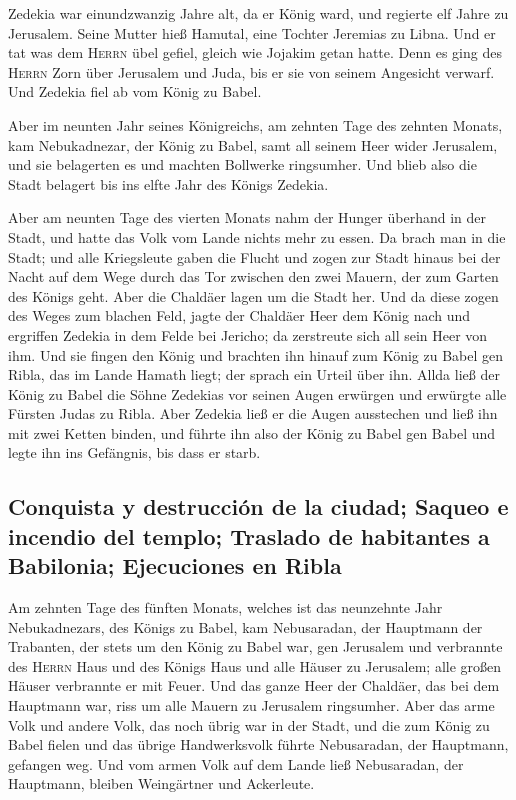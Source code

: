  Zedekia war einundzwanzig Jahre alt, da er König ward,
und regierte elf Jahre zu Jerusalem. Seine Mutter hieß Hamutal, eine
Tochter Jeremias zu Libna.  Und er tat was dem
\textsc{Herrn} übel gefiel, gleich wie Jojakim getan hatte.
 Denn es ging des \textsc{Herrn} Zorn über Jerusalem und
Juda, bis er sie von seinem Angesicht verwarf. Und Zedekia fiel ab vom
König zu Babel.

 Aber im neunten Jahr seines Königreichs, am zehnten Tage
des zehnten Monats, kam Nebukadnezar, der König zu Babel, samt all
seinem Heer wider Jerusalem, und sie belagerten es und machten Bollwerke
ringsumher.  Und blieb also die Stadt belagert bis ins
elfte Jahr des Königs Zedekia.

 Aber am neunten Tage des vierten Monats nahm der Hunger
überhand in der Stadt, und hatte das Volk vom Lande nichts mehr zu
essen.  Da brach man in die Stadt; und alle Kriegsleute
gaben die Flucht und zogen zur Stadt hinaus bei der Nacht auf dem Wege
durch das Tor zwischen den zwei Mauern, der zum Garten des Königs geht.
Aber die Chaldäer lagen um die Stadt her.  Und da diese
zogen des Weges zum blachen Feld, jagte der Chaldäer Heer dem König nach
und ergriffen Zedekia in dem Felde bei Jericho; da zerstreute sich all
sein Heer von ihm.  Und sie fingen den König und brachten
ihn hinauf zum König zu Babel gen Ribla, das im Lande Hamath liegt; der
sprach ein Urteil über ihn.  Allda ließ der König zu
Babel die Söhne Zedekias vor seinen Augen erwürgen und erwürgte alle
Fürsten Judas zu Ribla.  Aber Zedekia ließ er die Augen
ausstechen und ließ ihn mit zwei Ketten binden, und führte ihn also der
König zu Babel gen Babel und legte ihn ins Gefängnis, bis dass er starb.

\hypertarget{conquista-y-destrucciuxf3n-de-la-ciudad-saqueo-e-incendio-del-templo-traslado-de-habitantes-a-babilonia-ejecuciones-en-ribla}{%
\subsection{Conquista y destrucción de la ciudad; Saqueo e incendio del
templo; Traslado de habitantes a Babilonia; Ejecuciones en
Ribla}\label{conquista-y-destrucciuxf3n-de-la-ciudad-saqueo-e-incendio-del-templo-traslado-de-habitantes-a-babilonia-ejecuciones-en-ribla}}

 Am zehnten Tage des fünften Monats, welches ist das
neunzehnte Jahr Nebukadnezars, des Königs zu Babel, kam Nebusaradan, der
Hauptmann der Trabanten, der stets um den König zu Babel war, gen
Jerusalem  und verbrannte des \textsc{Herrn} Haus und des
Königs Haus und alle Häuser zu Jerusalem; alle großen Häuser verbrannte
er mit Feuer.  Und das ganze Heer der Chaldäer, das bei
dem Hauptmann war, riss um alle Mauern zu Jerusalem ringsumher.
 Aber das arme Volk und andere Volk, das noch übrig war
in der Stadt, und die zum König zu Babel fielen und das übrige
Handwerksvolk führte Nebusaradan, der Hauptmann, gefangen weg.
 Und vom armen Volk auf dem Lande ließ Nebusaradan, der
Hauptmann, bleiben Weingärtner und Ackerleute.

